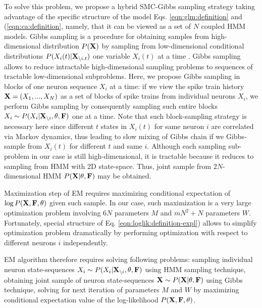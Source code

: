 To solve this problem, we propose a hybrid SMC-Gibbs sampling strategy taking advantage of the specific structure of the model Eqs. \eqref{eqn:glm:definition} and (\ref{eqn:ca:definition}, namely, that it can be viewed as a set of $N$ coupled HMM models. Gibbs sampling is a procedure for obtaining samples from high-dimensional distribution $P({\bf X})$ by sampling from low-dimensional conditional distributions $P(X_{i}(t)|{\bf X}_{\backslash i, t})$ one variable $X_{i}(t)$ at a time \cite{Gelfand1990}.  Gibbs sampling allows to reduce intractable high-dimensional sampling problems to sequences of tractable low-dimensional subproblems.  Here, we propose Gibbs sampling in blocks of one neuron sequence $X_{i}$ at a time: if we view the spike train history ${\bf X}=(X_1, ..., X_N)$ as a set of blocks of spike trains from individual neurons $X_i$, we perform Gibbs sampling by consequently sampling such entire blocks $X_i\sim P(X_{i}|{\bf X}_{\backslash i}, \mathbf{\theta}, {\bf F})$ one at a time.  Note that such block-sampling strategy is necessary here since different $t$ states in $X_i(t)$ for same neuron $i$ are correlated via Markov dynamics, thus leading to slow mixing of Gibbs chain if we Gibbs-sample from $X_i(t)$ for different $t$ and same $i$.  Although each sampling sub-problem in our case is still high-dimensional, it is tractable because it reduces to sampling from HMM with 2D state-space. Thus, joint sample from $2N$-dimensional HMM $P({\bf X}|\mathbf{\theta}, {\bf F})$ may be obtained.

Maximization step of EM requires maximizing conditional expectation of $\log P({\bf X}, {\bf F}, \mathbf{\theta})$ given such sample. In our case, such maximization is a very large optimization problem involving $6N$ parameters $M$ and $mN^2+N$ parameters $W$. Fortunately, special structure of Eq. \eqref{eqn:loglik:definition-expl}) allows to simplify optimization problem dramatically by performing optimization with respect to different neurons $i$ independently.

EM algorithm therefore requires solving following problems: sampling individual neuron state-sequences $X_i\sim P(X_{i}|{\bf X}_{\backslash i}, \mathbf{\theta}, {\bf F})$ using HMM sampling technique, obtaining joint sample of neuron state-sequences ${\bf X}\sim P({\bf X}|\mathbf{\theta}, {\bf F})$ using Gibbs technique, solving for next iteration of parameters $M$ and $W$ by maximizing conditional expectation value of the log-likelihood $P({\bf X}, {\bf F}, \mathbf{\theta})$.

